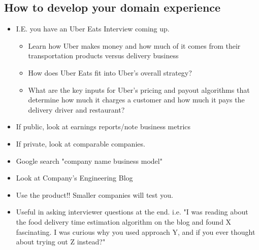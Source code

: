 \documentclass{article}
\begin{document}
\begin{multicols*}{2}
    \section{How to develop your domain experience}
    \renewcommand\labelitemi{{\boldmath$\cdot$}}
    \begin{itemize}[noitemsep]
        \item I.E. you have an Uber Eats Interview coming up.
        \begin{itemize}
            \item Learn how Uber makes money and how much 
            of it comes from their transportation products versus
            delivery business
            \item How does Uber Eats fit into Uber's overall 
            strategy?
            \item What are the key inputs for Uber's pricing 
            and payout algorithms that determine how much 
            it charges a customer and how much it pays the 
            delivery driver and restaurant?
        \end{itemize}
        \item If public, look at earnings reports/note business metrics
        \item If private, look at comparable companies.
        \item Google search "company name business model"
        \item Look at Company's Engineering Blog
        \item Use the product!! Smaller companies will test you.
        \item Useful in asking interviewer questions at the end. i.e. 
        "I was reading about the food delivery time estimation algorithm 
        on the blog and found X fascinating. I was curious why you used 
        approach Y, and if you ever thought about trying out Z instead?"
    \end{itemize}

\end{multicols*}
\end{document}
